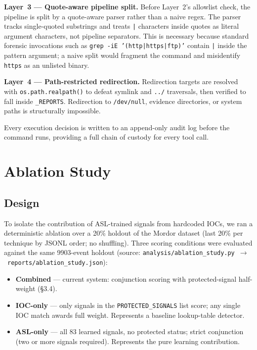 \documentclass[sigconf, nonacm]{acmart}
\begin{document}
\textbf{Layer~3 — Quote-aware pipeline split.} Before Layer~2's allowlist
check, the pipeline is split by a quote-aware parser rather than a
naive regex. The parser tracks single-quoted substrings and treats
\texttt{|} characters inside quotes as literal argument characters, not
pipeline separators. This is necessary because standard forensic
invocations such as \texttt{grep -iE '(http|https|ftp)'} contain
\texttt{|} inside the pattern argument; a naive split would fragment the
command and misidentify \texttt{https} as an unlisted binary.

\textbf{Layer~4 — Path-restricted redirection.} Redirection targets
are resolved with \texttt{os.path.realpath()} to defeat symlink and
\texttt{../} traversals, then verified to fall inside
\texttt{\_REPORTS}. Redirection to \texttt{/dev/null}, evidence
directories, or system paths is structurally impossible.

Every execution decision is written to an append-only audit log before
the command runs, providing a full chain of custody for every tool call.

\section{Ablation Study}
\label{sec:ablation}

\subsection{Design}

To isolate the contribution of ASL-trained signals from hardcoded IOCs,
we ran a deterministic ablation over a 20\% holdout of the Mordor
dataset (last 20\% per technique by JSONL order; no shuffling).
Three scoring conditions were evaluated against the same
\num{9903}-event holdout (source:
\texttt{analysis/ablation\_study.py}~$\to$~\texttt{reports/ablation\_study.json}):

\begin{itemize}\setlength\itemsep{2pt}
  \item \textbf{Combined} — current system: conjunction scoring with
    protected-signal half-weight (§3.4).
  \item \textbf{IOC-only} — only signals in the \texttt{PROTECTED\_SIGNALS}
    list score; any single IOC match awards full weight. Represents a
    baseline lookup-table detector.
  \item \textbf{ASL-only} — all 83 learned signals, no protected status;
    strict conjunction (two or more signals required). Represents the
    pure learning contribution.
\end{itemize}
\end{document}

